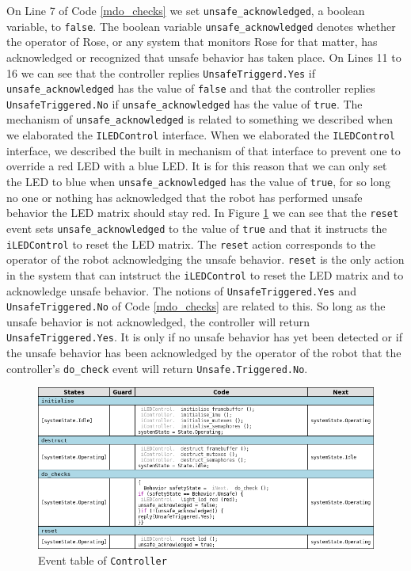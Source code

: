 \documentclass[12pt]{scrreprt}
\begin{document}
On Line 7 of Code \ref{mdo_checks} we set \texttt{unsafe\_acknowledged}, a boolean variable, to \texttt{false}. The boolean variable \texttt{unsafe\_acknowledged} denotes whether the operator of Rose, or any system that monitors Rose for that matter, has acknowledged or recognized that unsafe behavior has taken place. On Lines 11 to 16 we can see that the controller replies \texttt{UnsafeTriggerd.Yes} if \texttt{unsafe\_acknowledged} has the value of \texttt{false} and that the controller replies \texttt{UnsafeTriggered.No} if \texttt{unsafe\_acknowledged} has the value of \texttt{true}. The mechanism of \texttt{unsafe\_acknowledged} is related to something we described when we elaborated the \texttt{ILEDControl} interface. When we elaborated the \texttt{ILEDControl} interface, we described the built in mechanism of that interface to prevent one to override a red LED with a blue LED. It is for this reason that we can only set the LED to blue when \texttt{unsafe\_acknowledged} has the value of \texttt{true}, for so long no one or nothing has acknowledged that the robot has performed unsafe behavior the LED matrix should stay red. In Figure \ref{fig:controll_event_table} we can see that the \texttt{reset} event sets \texttt{unsafe\_acknowledged} to the value of \texttt{true} and that it instructs the \texttt{iLEDControl} to reset the LED matrix. The \texttt{reset} action corresponds to the operator of the robot acknowledging the unsafe behavior. \texttt{reset} is the only action in the system that can intstruct the \texttt{iLEDControl} to reset the LED matrix and to acknowledge unsafe behavior. The notions of \texttt{UnsafeTriggered.Yes} and \texttt{UnsafeTriggered.No} of Code \ref{mdo_checks} are related to this. So long as the unsafe behavior is not acknowledged, the controller will return \texttt{UnsafeTriggered.Yes}. It is only if no unsafe behavior has yet been detected or if the unsafe behavior has been acknowledged by the operator of the robot that the controller's \texttt{do\_check} event will return \texttt{Unsafe.Triggered.No}.

 \begin{figure}[H]
     \centering
     \includegraphics[width=\textwidth]{Figures/results/modelling_figures/Controller/Controller_event_table.png}
     \caption{Event table of \texttt{Controller}}
     \label{fig:controll_event_table}
 \end{figure}
 
\end{document}
